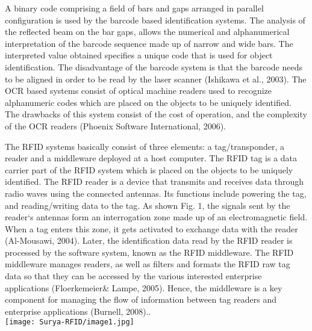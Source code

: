 \documentclass[a4paper,12pt]{article}
\begin{document}
\begin{multicols}{2}
A binary code comprising a field of bars and gaps arranged in parallel configuration is used by the barcode based identification systems. The analysis of the reflected beam on the bar gaps, allows the numerical and alphanumerical interpretation of the barcode sequence made up of narrow and wide bars. The interpreted value obtained specifies a unique code that is used for object identification. The disadvantage of the barcode system is that the barcode needs to be aligned in order to be read by the laser scanner (Ishikawa et al., 2003). The OCR based systems consist of optical machine readers used to recognize alphanumeric codes which are placed on the objects to be uniquely identified. The drawbacks of this system consist of the cost of operation, and the complexity of the OCR readers (Phoenix Software International, 2006).

The RFID systems basically consist of three elements: a tag/transponder, a reader and a middleware deployed at a host computer. The RFID tag is a data carrier part of the RFID system which is placed on the objects to be uniquely identified. The RFID reader is a device that transmits and receives data through radio waves using the connected antennas. Its functions include powering the tag, and reading/writing data to the tag. As shown Fig. 1, the signals sent by the reader‘s antennas form an interrogation zone made up of an electromagnetic field. When a tag enters this zone, it gets activated to exchange data with the reader (Al-Mousawi, 2004). Later, the identification data read by the RFID reader is processed by the software system, known as the RFID middleware. The RFID middleware manages readers, as well as filters and formats the RFID raw tag data so that they can be accessed by the various interested enterprise applications (Floerkemeier& Lampe, 2005). Hence, the middleware is a key component for managing the flow of information between tag readers and enterprise applications (Burnell, 2008)..\\

\texttt{[image: Surya-RFID/image1.jpg]}


\end{multicols}
\end{document}

